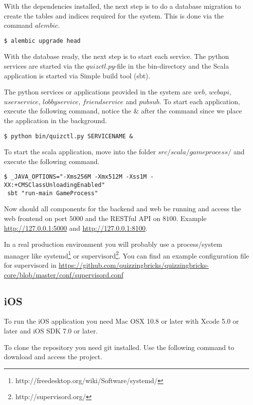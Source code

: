 With the dependencies installed, the next step is to do a database migration to create the tables and indices required for the system. This is done via the command $alembic$.

\begin{verbatim}
$ alembic upgrade head
\end{verbatim}

With the database ready, the next step is to start each service. The python services are started via the $quizctl.py$-file in the bin-directory and the Scala application is started via Simple build tool (sbt).

The python services or applications provided in the system are $web$, $webapi$, $userservice$, $lobbyservice$, $friendservice$ and $pubsub$.
To start each application, execute the following command, notice the $\&$ after the command since we place the application in the background.

\begin{verbatim}
$ python bin/quizctl.py SERVICENAME &
\end{verbatim}

To start the scala application, move into the folder $src/scala/gameprocess/$ and execute the following command.
\begin{verbatim}
$ _JAVA_OPTIONS="-Xms256M -Xmx512M -Xss1M -XX:+CMSClassUnloadingEnabled"
 sbt "run-main GameProcess"
\end{verbatim}

Now should all components for the backend and web be running and access the web frontend on port $5000$ and the RESTful API on $8100$. Example \url{http://127.0.0.1:5000} and \url{http://127.0.0.1:8100}.

In a real production environment you will probably use a process/system manager like systemd\footnote{http://freedesktop.org/wiki/Software/systemd/} or supervisord\footnote{http://supervisord.org/}. You can find an example configuration file for supervisord in 
\url{https://github.com/quizzingbricks/quizzingbricks-core/blob/master/conf/supervisord.conf}

\subsection{iOS}
To run the iOS application you need Mac OSX 10.8 or later with Xcode 5.0 or later and iOS SDK 7.0 or later.

To clone the repository you need git installed. Use the following command to download and access the project.

